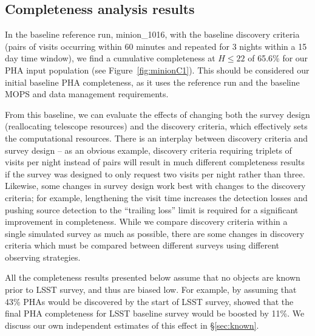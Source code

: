 \subsection{Completeness analysis results}

In the baseline reference run, minion\_1016, with the baseline discovery
criteria (pairs of visits occurring within 60 minutes and
repeated for 3 nights within a 15 day time window), we find a cumulative
completeness at $H\le22$ of 65.6\% for our PHA input population (see
Figure~\ref{fig:minionC1}). This should be considered our initial baseline PHA
completeness, as it uses the reference run and the baseline MOPS and data
management requirements.

From this baseline, we can evaluate the effects of changing both the survey design (reallocating telescope resources) and the discovery criteria, which effectively sets the computational resources.
There is an interplay between discovery criteria and survey design -- as an obvious example, discovery criteria requiring triplets of visits per night instead of pairs will result in much different completeness results if the survey was designed to only request two visits per night rather than three. Likewise, some changes in survey design work best with changes to the discovery criteria; for example, lengthening the visit time increases the detection losses and pushing source detection to the ``trailing loss'' limit is required for a significant improvement in completeness. While we compare discovery criteria within a single simulated survey as much as possible, there are some changes in discovery criteria which must be compared between different surveys using different observing strategies.

All the completeness results presented below assume that no objects are known prior to LSST survey,
and thus are biased low. For example, by assuming that 43\% PHAs would be discovered by the start of
LSST survey, \cite{GMS2016} showed that the final PHA completeness for LSST baseline survey would
be boosted by 11\%. We discuss our own independent estimates of this effect in \S\ref{sec:known}.

